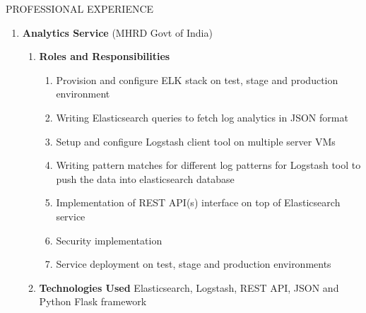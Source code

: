 \documentclass{resume} %
\newcommand{\blank}[1]{\hspace*{#1}}
\begin{document}
\begin{rSection}{PROFESSIONAL EXPERIENCE}
\begin{rSubsection}
\begin{enumerate}[label=\bfseries\arabic*]
\item \textbf{Analytics Service} (MHRD Govt of India)
  \begin{enumerate}
  \item \textbf{Roles and Responsibilities }
    \begin{enumerate}
    \item Provision and configure ELK stack on test, stage and
      production environment
    \item Writing Elasticsearch queries to fetch log analytics in JSON
      format
    \item Setup and configure Logstash client tool on multiple server
      VMs
    \item Writing pattern matches for different log patterns for
      Logstash tool to push the data into elasticsearch database
    \item Implementation of REST API(s) interface on top of
      Elasticsearch service
    \item Security implementation
    \item Service deployment on test, stage and production environments
    \end{enumerate}
  \item \textbf{Technologies Used } Elasticsearch, Logstash, REST API,
    JSON and Python Flask framework
  \end{enumerate}


\end{enumerate}
\end{rSubsection}
\end{rSection}
\end{document}
